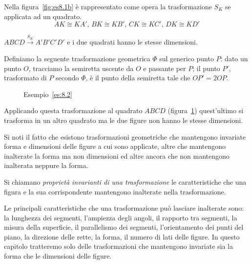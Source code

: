 \begin{exrig}
\begin{esempio}
Nella figura~\ref{fig:es8.1b} è rappresentato come opera la 
trasformazione $S_K$ se applicata ad un quadrato.
\[AK\cong KA'\text{, }BK\cong KB'\text{, }CK\cong KC'\text{, }DK\cong 
KD'\]

$ABCD\overset{S_K}{\rightarrow}A'B'C'D'$ e i due quadrati hanno le 
stesse dimensioni.
\end{esempio}

\begin{esempio}\label{es:8.2}
Definiamo la seguente trasformazione geometrica $\Phi$ sul generico 
punto $P$: dato un punto $O$, tracciamo la semiretta uscente da $O$ e 
passante per $P$; il punto $P'$, trasformato di $P$ secondo $\Phi$, è 
il punto della semiretta tale che $OP'=2OP$.\vspace{7pt}


\begin{inaccessibleblock}
 \begin{figure}[!htb]
    \centering
  \caption{Esempio~\ref{es:8.2}}\label{fig:es8.2}
\end{figure}
\end{inaccessibleblock}

Applicando questa trasformazione al quadrato $ABCD$ 
(figura~\ref{fig:es8.2}) quest'ultimo si trasforma in un altro 
quadrato ma le due figure non hanno le stesse dimensioni.
\end{esempio}
\end{exrig}

Si noti il fatto che esistono trasformazioni geometriche che 
mantengono invariate forma e dimensioni delle figure a cui sono 
applicate, altre che mantengono inalterate la forma ma non dimensioni 
ed altre ancora che non mantengono inalterata neppure la forma.

\begin{definizione}
Si chiamano \emph{proprietà invarianti di una trasformazione} le 
caratteristiche che una figura e la sua corrispondente mantengono 
inalterate nella trasformazione.
\end{definizione}

Le principali caratteristiche che una trasformazione può lasciare 
inalterate sono: la lunghezza dei segmenti, l'ampiezza degli angoli, 
il rapporto tra segmenti, la misura della superficie, il parallelismo 
dei segmenti, l'orientamento dei punti del piano, la direzione delle 
rette, la forma, il numero di lati delle figure.
In questo capitolo tratteremo solo delle trasformazioni che 
mantengono invariate sia la forma che le dimensioni delle figure.

